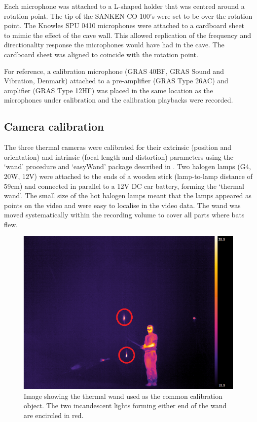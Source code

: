 \documentclass[
]{book}
\begin{document}
Each microphone was attached to a L-shaped holder that was centred around a rotation point. The tip of the SANKEN CO-100's were set to be over the rotation point. The Knowles SPU 0410 microphones were attached to a cardboard sheet to mimic the effect of the cave wall. This allowed replication of the frequency and directionality response the microphones would have had in the cave. The cardboard sheet was aligned to coincide with the rotation point.

For reference, a calibration microphone (GRAS 40BF, GRAS Sound and Vibration, Denmark) attached to a pre-amplifier (GRAS Type 26AC) and amplifier (GRAS Type 12HF) was placed in the same location as the microphones under calibration and the calibration playbacks were recorded.

\hypertarget{ushichkacamcalib}{%
\subsection{Camera calibration}\label{ushichkacamcalib}}

The three thermal cameras were calibrated for their extrinsic (position and orientation) and intrinsic (focal length and distortion) parameters using the `wand' procedure and `easyWand' package described in \citet{Theriault2014}. Two halogen lamps (G4, 20W, 12V)
were attached to the ends of a wooden stick (lamp-to-lamp distance of 59cm) and connected in parallel to a 12V DC car battery, forming the `thermal wand'. The small size of the hot halogen lamps meant that the lamps appeared as points on the video and were easy to localise in the video data. The wand was moved systematically within the recording volume to cover all parts where bats flew.

\begin{figure}
\includegraphics[width=1\linewidth]{original_papers/ushichka-figures/wand_marked_} \caption{Image showing the thermal wand used as the common calibration object. The two incandescent lights forming either end of the wand are encircled in red.}\label{fig:wandimg}
\end{figure}
\end{document}
